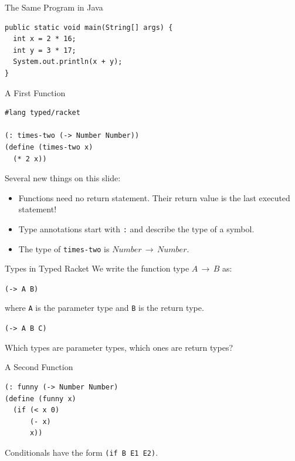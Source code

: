 \documentclass{beamer}
\begin{document}
\begin{frame}[fragile]{The Same Program in Java}
\begin{lstlisting}[style=Java]
public static void main(String[] args) {
  int x = 2 * 16;
  int y = 3 * 17;
  System.out.println(x + y);
}
\end{lstlisting}
\end{frame}

\begin{frame}[fragile]{A First Function}
\begin{lstlisting}
#lang typed/racket

(: times-two (-> Number Number))
(define (times-two x)
  (* 2 x))
\end{lstlisting}

\pause{}

Several new things on this slide:

\begin{itemize}
\pause{} \item Functions need no return statement. Their return value is the last executed statement!
\pause{} \item Type annotations start with \lstinline{:} and describe the type of a symbol.
\pause{} \item The type of \lstinline{times-two} is $Number \, \rightarrow \, Number$.
\end{itemize}
\end{frame}

\begin{frame}[fragile]{Types in Typed Racket}
We write the function type $A \, \rightarrow \, B$ as:

\begin{center}
  \lstinline{(-> A B)}
\end{center}

where \lstinline{A} is the parameter type and \lstinline{B} is the return type.

\vspace{1.5cm}

\pause{}

\begin{center}
  \lstinline{(-> A B C)}
\end{center}

Which types are parameter types, which ones are return types?
\end{frame}

\begin{frame}[fragile]{A Second Function}
\begin{lstlisting}
(: funny (-> Number Number)
(define (funny x)
  (if (< x 0)
      (- x)
      x))
\end{lstlisting}

\vspace{1.5cm}

\pause{}

Conditionals have the form \lstinline{(if B E1 E2)}.
\end{frame}
\end{document}
